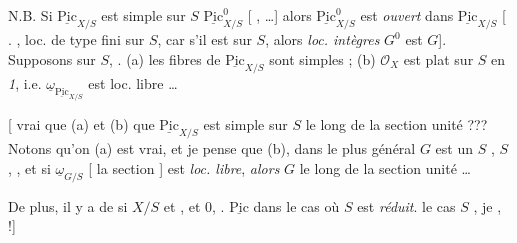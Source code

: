 \documentclass[11pt,a4paper]{article}
\begin{document}
N.B.  \emph{} Si $\underline{\mathrm{Pic}}_{X/S}$ est simple sur $S$    $\underline{\mathrm{Pic}}^{0}_{X/S}$ [\ill{} \struck{\ill{}} \ill{} \ill{} \ill{}, \ill{}       …]   alors $\underline{\mathrm{Pic}}^{0}_{X/S}$ est \emph{ouvert} dans $\underline{\mathrm{Pic}}_{X/S}$ [  .  , \ill{} loc. de type fini sur $S$, car s'il est \emph{} sur $S$, alors          \ill{}    \ill{}    \emph{loc. intègres} \struck{\ill{}} $G^{0}$ est   $G$].
Supposons   sur $S$,     .
 (a) les fibres de $\underline{\mathrm{Pic}}_{X/S}$ sont simples ;
(b) $\mathcal{O}_X$ est  plat sur $S$ en  \emph{1}, i.e. $\underline{\omega}_{\underline{\mathrm{Pic}}_{X/S}}$ est loc. libre …

[  vrai  que (a) et (b)  que $\underline{\mathrm{Pic}}_{X/S}$ est simple sur $S$ le long de la section unité ??? Notons qu'on   \ill{} (a) est  vrai, et \struck{\ill{}} je pense que (b), dans le  plus général  $G$ est un   $S$ \struck{\ill{}}, $S$ ,   , et si $\underline{\omega}_{G/S}$ [    la section ] est \emph{loc. libre}, \emph{alors} $G$   le long de la section unité …

De plus, il y a  de   si  $X/S$  et , et   $0$,        .      \emph{}  $\underline{\mathrm{Pic}}$ dans le cas où $S$ est \emph{réduit}.  le cas  $S$  , je   , \emph{ } !]
\end{document}
